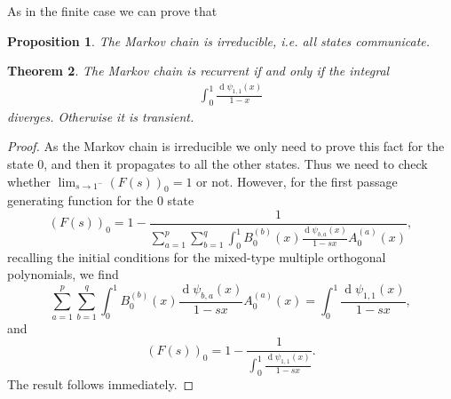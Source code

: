 \documentclass[11pt]{amsart}
\theoremstyle{plain}
\newtheorem{teo}{Theorem}[section]
\newtheorem{pro}[teo]{Proposition}
\renewcommand{\d}{\operatorname{d}}
\newcommand{\1}{\text{\fontseries{bx}\selectfont \textup 1}}
\begin{document}
As in the finite case we can prove that
\begin{pro}
	The Markov chain is irreducible, i.e. all states communicate.
\end{pro}

\begin{teo}
	The Markov chain is recurrent if and only if the integral
	\begin{align*}
		\int_0^{1}\frac{\d\psi_{1,1}(x)}{1-x}
	\end{align*}
	diverges. Otherwise it is transient.
\end{teo}
\begin{proof}
	As the Markov chain is irreducible we only need to prove this fact for the state $0$, and then it propagates to all the other states. Thus we need to check whether $\lim_{s\to1^-} (F(s))_0=1$ or not. However, for the first passage generating function for the $0$ state
	\[
	(F(s))_{0}=1-\frac{1}{\sum_{a=1}^p\sum_{b=1}^{q}	\int_0^1B^{(b)}_0(x)\frac{\d\psi_{b,a}(x)}{1-sx}A^{(a)}_{0}(x)},
	\]
	recalling the initial conditions for the mixed-type multiple orthogonal polynomials, we find
	\[
	\sum_{a=1}^p\sum_{b=1}^{q}\int_0^1B^{(b)}_0(x)\frac{\d\psi_{b,a}(x)}{1-sx}A^{(a)}_{0}(x)=
	\int_0^1\frac{\d\psi_{1,1}(x)}{1-sx},
	\]
	and
	\[
	(F(s))_{0}=1-\frac{1}{\int_0^1\frac{\d\psi_{1,1}(x)}{1-sx}}.
	\]
	The result follows immediately.
\end{proof}
\end{document}
